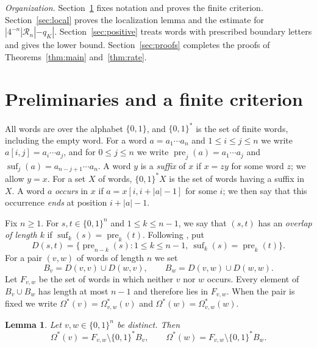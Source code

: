 \documentclass[11pt]{amsart}
\newtheorem{lemma}[theorem]{Lemma}
\theoremstyle{remark}
\numberwithin{equation}{section}
\newcommand{\pre}{\operatorname{pre}}
\newcommand{\suf}{\operatorname{suf}}
\newcommand{\Os}{\Omega^{*}}
\newcommand{\R}{\mathcal{R}}
\newcommand{\bits}{\{0,1\}}
\begin{document}
\emph{Organization.} Section~\ref{sec:prelim} fixes notation and proves the finite criterion. Section~\ref{sec:local} proves the localization lemma and the estimate for $|4^{-n}|\R_n|-q_K|$. Section~\ref{sec:positive} treats words with prescribed boundary letters and gives the lower bound. Section~\ref{sec:proofs} completes the proofs of Theorems~\ref{thm:main} and~\ref{thm:rate}.

\section{Preliminaries and a finite criterion}\label{sec:prelim}

All words are over the alphabet $\bits$, and $\bits^*$ is the set of finite words, including the empty word. For a word $a=a_1\cdots a_n$ and $1\le i\le j\le n$ we write $a[i,j]=a_i\cdots a_j$, and for $0\le j\le n$ we write $\pre_j(a)=a_1\cdots a_j$ and $\suf_j(a)=a_{n-j+1}\cdots a_n$. A word $y$ is a \emph{suffix} of $x$ if $x=zy$ for some word $z$; we allow $y=x$. For a set $X$ of words, $\bits^*X$ is the set of words having a suffix in $X$. A word $a$ \emph{occurs} in $x$ if $a=x[i,i+|a|-1]$ for some $i$; we then say that this occurrence \emph{ends} at position $i+|a|-1$.

Fix $n\ge1$. For $s,t\in\bits^n$ and $1\le k\le n-1$, we say that $(s,t)$ has an \emph{overlap of length $k$} if $\suf_k(s)=\pre_k(t)$. Following \cite[Definition~6]{DPR}, put
\begin{equation}\label{eq:D}
  D(s,t)=\{\pre_{n-k}(s): 1\le k\le n-1,\ \suf_k(s)=\pre_k(t)\}.
\end{equation}
For a pair $(v,w)$ of words of length $n$ we set
\begin{equation}\label{eq:B}
  B_v=D(v,v)\cup D(w,v),\qquad B_w=D(v,w)\cup D(w,w).
\end{equation}
Let $F_{v,w}$ be the set of words in which neither $v$ nor $w$ occurs. Every element of $B_v\cup B_w$ has length at most $n-1$ and therefore lies in $F_{v,w}$. When the pair is fixed we write $\Os(v)=\Os_{v,w}(v)$ and $\Os(w)=\Os_{v,w}(w)$.

\begin{lemma}\label{lem:language}
Let $v,w\in\bits^n$ be distinct. Then
\[
  \Os(v)=F_{v,w}\setminus \bits^*B_v,\qquad \Os(w)=F_{v,w}\setminus\bits^*B_w .
\]
\end{lemma}
\end{document}
